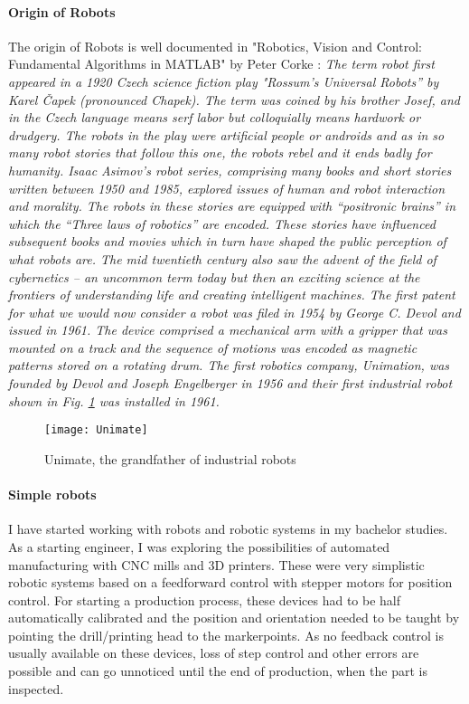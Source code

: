 \paragraph{Origin of Robots}
The origin of Robots is well documented in "Robotics, Vision and Control: Fundamental Algorithms in MATLAB" by Peter Corke \cite{CorkeRoboticVisionControl}:
\textit{The term robot ﬁrst appeared in a 1920 Czech science ﬁction play "Rossum’s Universal Robots” by Karel \v{C}apek (pronounced Chapek). 
The term was coined by his brother Josef, and in the Czech language means serf labor but colloquially means hardwork or drudgery. 
The robots in the play were artiﬁcial people or androids and as in so many robot stories that follow this one, the robots rebel and it ends badly for humanity. 
Isaac Asimov’s robot series, comprising many books and short stories written between 1950 and 1985, explored issues of human and robot interaction and morality. 
The robots in these stories are equipped with “positronic brains” in which the “Three laws of robotics” are encoded. These stories have inﬂuenced subsequent books and movies which in turn have shaped the public perception of what robots are. 
The mid twentieth century also saw the advent of the ﬁeld of cybernetics  – an uncommon term today but then an exciting science at the frontiers of understanding life and creating intelligent machines.
The ﬁrst patent for what we would now consider a robot was ﬁled in 1954 by George C. Devol and issued in 1961. 
The device comprised a mechanical arm with a gripper that was mounted on a track and the sequence of motions was encoded as magnetic patterns stored on a rotating drum. 
The ﬁrst robotics company, Unimation, was founded by Devol and Joseph Engelberger in 1956 and their ﬁrst industrial robot shown in Fig. \ref{fig:Unimate} was installed in 1961.} 

\begin{figure}[H]
	\texttt{[image: Unimate]}
	\caption{Unimate, the grandfather of industrial robots \cite{UnimateIEEE}  }
	\label{fig:Unimate}
\end{figure}
\medskip



\paragraph{Simple robots}
I have started working with robots and robotic systems in my bachelor studies. 
As a starting engineer, I was exploring the possibilities of automated manufacturing with CNC mills and 3D printers. 
These were very simplistic robotic systems based on a feedforward control with stepper motors for position control. 
For starting a production process, these devices had to be half automatically calibrated and the position and orientation needed to be taught by pointing the drill/printing head to the markerpoints. 
As no feedback control is usually available on these devices, loss of step control and other errors are possible and can go unnoticed until the end of production, when the part is inspected.
\medskip


